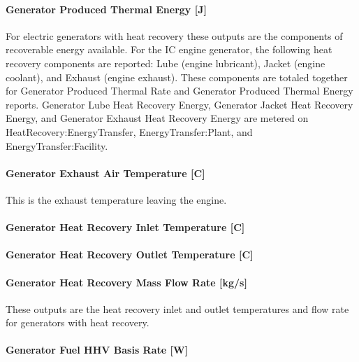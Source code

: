 \paragraph{Generator Produced Thermal Energy {[}J{]}}\label{generator-produced-thermal-energy-j}

For electric generators with heat recovery these outputs are the components of recoverable energy available. For the IC engine generator, the following heat recovery components are reported: Lube (engine lubricant), Jacket (engine coolant), and Exhaust (engine exhaust). These components are totaled together for Generator Produced Thermal Rate and Generator Produced Thermal Energy reports. Generator Lube Heat Recovery Energy, Generator Jacket Heat Recovery Energy, and Generator Exhaust Heat Recovery Energy are metered on HeatRecovery:EnergyTransfer, EnergyTransfer:Plant, and EnergyTransfer:Facility.

\paragraph{Generator Exhaust Air Temperature {[}C{]}}\label{generator-exhaust-air-temperature-c}

This is the exhaust temperature leaving the engine.

\paragraph{Generator Heat Recovery Inlet Temperature {[}C{]}}\label{generator-heat-recovery-inlet-temperature-c}

\paragraph{Generator Heat Recovery Outlet Temperature {[}C{]}}\label{generator-heat-recovery-outlet-temperature-c}

\paragraph{Generator Heat Recovery Mass Flow Rate {[}kg/s{]}}\label{generator-heat-recovery-mass-flow-rate-kgs}

These outputs are the heat recovery inlet and outlet temperatures and flow rate for generators with heat recovery.

\paragraph{Generator Fuel HHV Basis Rate {[}W{]}}\label{generator-fuel-hhv-basis-rate-w}


